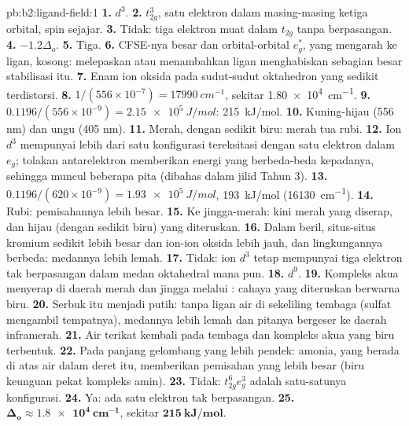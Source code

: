 \begin{solution}{pb:b2:ligand-field:1}
\textbf{1.} $d^3$.
\textbf{2.} $t_{2g}^3$, satu elektron dalam masing-masing ketiga orbital, spin sejajar.
\textbf{3.} Tidak: tiga elektron muat dalam $t_{2g}$ tanpa berpasangan.
\textbf{4.} $-1.2\Delta_o$.
\textbf{5.} Tiga.
\textbf{6.} CFSE-nya besar dan orbital-orbital $e_g^*$, yang mengarah ke
ligan, kosong: melepaskan atau menambahkan ligan menghabiskan sebagian besar
stabilisasi itu.
\textbf{7.} Enam ion oksida pada sudut-sudut oktahedron yang sedikit terdistorsi.
\textbf{8.} $1/(556 \times 10^{-7}) = \qty{17990}{cm^{-1}}$, sekitar \qty{1.80e4}{cm^{-1}}.
\textbf{9.} $0.1196/(556 \times 10^{-9}) = \qty{2.15e5}{J/mol}$: \qty{215}{kJ/mol}.
\textbf{10.} Kuning-hijau (556 nm) dan ungu (405 nm).
\textbf{11.} Merah, dengan sedikit biru: merah tua rubi.
\textbf{12.} Ion $d^3$ mempunyai lebih dari satu konfigurasi tereksitasi
dengan satu elektron dalam $e_g$; tolakan antarelektron memberikan energi
yang berbeda-beda kepadanya, sehingga muncul beberapa pita (dibahas dalam
jilid Tahun 3).
\textbf{13.} $0.1196/(620 \times 10^{-9}) = \qty{1.93e5}{J/mol}$, \qty{193}{kJ/mol}
(\qty{16130}{cm^{-1}}).
\textbf{14.} Rubi: pemisahannya lebih besar.
\textbf{15.} Ke jingga-merah: kini merah yang diserap, dan hijau (dengan
sedikit biru) yang diteruskan.
\textbf{16.} Dalam beril, situs-situs kromium sedikit lebih besar dan
ion-ion oksida lebih jauh, dan lingkungannya berbeda: medannya lebih lemah.
\textbf{17.} Tidak: ion $d^3$ tetap mempunyai tiga elektron tak berpasangan
dalam medan oktahedral mana pun.
\textbf{18.} $d^9$.
\textbf{19.} Kompleks akua menyerap di daerah merah dan jingga melalui
: cahaya yang diteruskan berwarna biru.
\textbf{20.} Serbuk itu menjadi putih: tanpa ligan air di sekeliling tembaga
(sulfat mengambil tempatnya), medannya lebih lemah dan pitanya bergeser ke
daerah inframerah.
\textbf{21.} Air terikat kembali pada tembaga dan kompleks akua yang biru
terbentuk.
\textbf{22.} Pada panjang gelombang yang lebih pendek: amonia, yang berada
di atas air dalam deret itu, memberikan pemisahan yang lebih besar (biru
keunguan pekat kompleks amin).
\textbf{23.} Tidak: $t_{2g}^6e_g^3$ adalah satu-satunya konfigurasi.
\textbf{24.} Ya: ada satu elektron tak berpasangan.
\textbf{25.} $\boldsymbol{\Delta_o \approx \qty{1.8e4}{cm^{-1}}}$, sekitar
$\boldsymbol{\qty{215}{kJ/mol}}$.
\end{solution}
